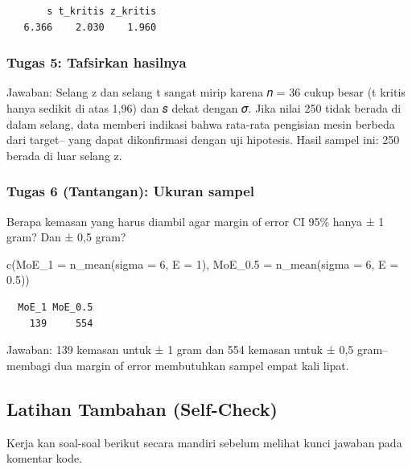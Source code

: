 \documentclass[
  indonesian,
  letterpaper,
]{book}
\newenvironment{Shaded}{\begin{snugshade}}{\end{snugshade}}
\newcommand{\AttributeTok}[1]{\textcolor[rgb]{0.40,0.45,0.13}{#1}}
\newcommand{\DecValTok}[1]{\textcolor[rgb]{0.68,0.00,0.00}{#1}}
\newcommand{\FloatTok}[1]{\textcolor[rgb]{0.68,0.00,0.00}{#1}}
\newcommand{\FunctionTok}[1]{\textcolor[rgb]{0.28,0.35,0.67}{#1}}
\newcommand{\NormalTok}[1]{\textcolor[rgb]{0.00,0.23,0.31}{#1}}
\begin{document}
\begin{verbatim}
       s t_kritis z_kritis 
   6.366    2.030    1.960 
\end{verbatim}

\subsubsection{Tugas 5: Tafsirkan
hasilnya}\label{tugas-5-tafsirkan-hasilnya}

Jawaban: Selang z dan selang t sangat mirip karena 𝑛 = 36 cukup besar (t
kritis hanya sedikit di atas 1,96) dan 𝑠 dekat dengan 𝜎. Jika nilai 250
tidak berada di dalam selang, data memberi indikasi bahwa rata-rata
pengisian mesin berbeda dari target-- yang dapat dikonfirmasi dengan uji
hipotesis. Hasil sampel ini: 250 berada di luar selang z.

\subsubsection{Tugas 6 (Tantangan): Ukuran
sampel}\label{tugas-6-tantangan-ukuran-sampel}

Berapa kemasan yang harus diambil agar margin of error CI 95\% hanya ± 1
gram? Dan ± 0,5 gram?

\begin{Shaded}
\begin{Highlighting}[]
\FunctionTok{c}\NormalTok{(}\AttributeTok{MoE\_1 =} \FunctionTok{n\_mean}\NormalTok{(}\AttributeTok{sigma =} \DecValTok{6}\NormalTok{, }\AttributeTok{E =} \DecValTok{1}\NormalTok{), }\AttributeTok{MoE\_0.5 =} \FunctionTok{n\_mean}\NormalTok{(}\AttributeTok{sigma =} \DecValTok{6}\NormalTok{, }\AttributeTok{E =} \FloatTok{0.5}\NormalTok{))}
\end{Highlighting}
\end{Shaded}

\begin{verbatim}
  MoE_1 MoE_0.5 
    139     554 
\end{verbatim}

Jawaban: 139 kemasan untuk ± 1 gram dan 554 kemasan untuk ± 0,5 gram--
membagi dua margin of error membutuhkan sampel empat kali lipat.

\subsection{Latihan Tambahan
(Self-Check)}\label{latihan-tambahan-self-check}

Kerja kan soal-soal berikut secara mandiri sebelum melihat kunci jawaban
pada komentar kode.
\end{document}
